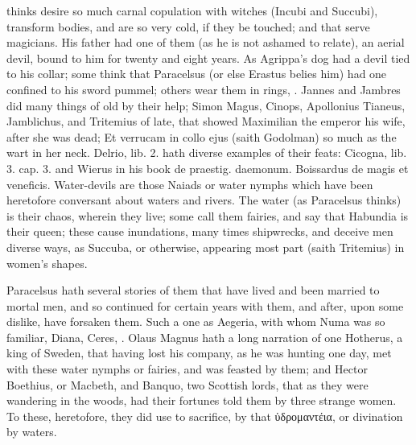 {{thinks desire so much carnal copulation with witches (Incubi and
Succubi), transform bodies, and are so very cold, if they be touched;
and that serve magicians. His father had one of them (as he is not
ashamed to relate), an aerial devil, bound to him for twenty and
eight years. As Agrippa's dog had a devil tied to his collar; some
think that Paracelsus (or else Erastus belies him) had one confined to
his sword pummel; others wear them in rings, \etc{}. Jannes and Jambres did
many things of old by their help; Simon Magus, Cinops, Apollonius
Tianeus, Jamblichus, and Tritemius of late, that showed Maximilian the
emperor his wife, after she was dead; Et verrucam in collo ejus (saith
Godolman) so much as the wart in her neck. Delrio, lib. 2. hath
diverse examples of their feats: Cicogna, lib. 3. cap. 3. and Wierus in
his book \textlatin{de praestig. daemonum. Boissardus de magis et veneficis}.
Water-devils are those Naiads or water nymphs which have been
heretofore conversant about waters and rivers. The water (as Paracelsus
thinks) is their chaos, wherein they live; some call them fairies, and
say that Habundia is their queen; these cause inundations, many times
shipwrecks, and deceive men diverse ways, as Succuba, or otherwise,
appearing most part (saith Tritemius) in women's shapes.

Paracelsus hath several stories of them that have lived and been
married to mortal men, and so continued for certain years with them,
and after, upon some dislike, have forsaken them. Such a one as
Aegeria, with whom Numa was so familiar, Diana, Ceres, \etc{}. Olaus
Magnus hath a long narration of one Hotherus, a king of Sweden, that
having lost his company, as he was hunting one day, met with these
water nymphs or fairies, and was feasted by them; and Hector Boethius,
or Macbeth, and Banquo, two Scottish lords, that as they were wandering
in the woods, had their fortunes told them by three strange women. To
these, heretofore, they did use to sacrifice, by that \textgreek{ὑδρομαντέια}, or
divination by waters.

}}
